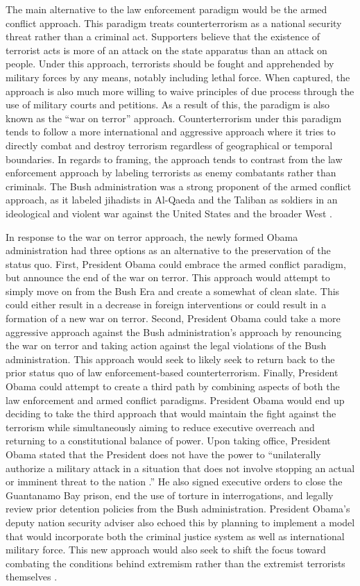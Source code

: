 \documentclass[12pt]{article}
\begin{document}
The main alternative to the law enforcement paradigm would be the armed conflict approach.
This paradigm treats counterterrorism as a national security threat rather than a criminal act.
Supporters believe that the existence of terrorist acts is more of an attack on the state apparatus than an attack on people.
Under this approach, terrorists should be fought and apprehended by military forces by any means, notably including lethal force.
When captured, the approach is also much more willing to waive principles of due process through the use of military courts and petitions.
As a result of this, the paradigm is also known as the ``war on terror'' approach.
Counterterrorism under this paradigm tends to follow a more international and aggressive approach where it tries to directly combat and destroy terrorism regardless of geographical or temporal boundaries.
In regards to framing, the approach tends to contrast from the law enforcement approach by labeling terrorists as enemy combatants rather than criminals.
The Bush administration was a strong proponent of the armed conflict approach, as it labeled jihadists in Al-Qaeda and the Taliban as soldiers in an ideological and violent war against the United States and the broader West \autocite[3]{starr-deelen2018}.

In response to the war on terror approach, the newly formed Obama administration had three options as an alternative to the preservation of the status quo.
First, President Obama could embrace the armed conflict paradigm, but announce the end of the war on terror.
This approach would attempt to simply move on from the Bush Era and create a somewhat of clean slate.
This could either result in a decrease in foreign interventions or could result in a formation of a new war on terror.
Second, President Obama could take a more aggressive approach against the Bush administration's approach by renouncing the war on terror and taking action against the legal violations of the Bush administration.
This approach would seek to likely seek to return back to the prior status quo of law enforcement-based counterterrorism.
Finally, President Obama could attempt to create a third path by combining aspects of both the law enforcement and armed conflict paradigms.
President Obama would end up deciding to take the third approach that would maintain the fight against the terrorism while simultaneously aiming to reduce executive overreach and returning to a constitutional balance of power.
Upon taking office, President Obama stated that the President does not have the power to ``unilaterally authorize a military attack in a situation that does not involve stopping an actual or imminent threat to the nation \autocite[6]{starr-deelen2018}.''
He also signed executive orders to close the Guantanamo Bay prison, end the use of torture in interrogations, and legally review prior detention policies from the Bush administration.
President Obama's deputy nation security adviser also echoed this by planning to implement a model that would incorporate both the criminal justice system as well as international military force.
This new approach would also seek to shift the focus toward combating the conditions behind extremism rather than the extremist terrorists themselves \autocite[7]{starr-deelen2018}.
\end{document}

